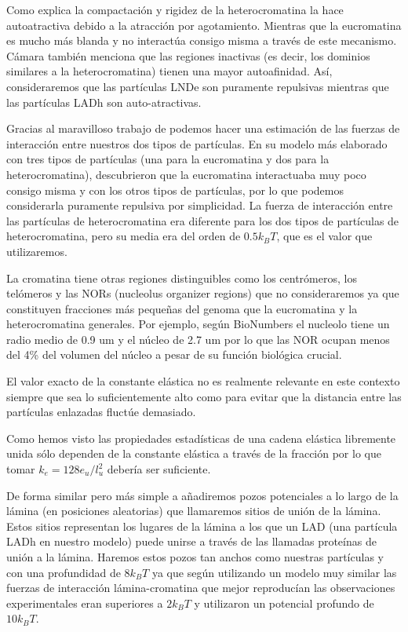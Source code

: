 Como explica \cite{Camara2023} la compactación y rigidez de la heterocromatina la hace autoatractiva debido a la atracción por agotamiento. Mientras que la eucromatina es mucho más blanda y no interactúa consigo misma a través de este mecanismo. Cámara también menciona que las regiones inactivas (es decir, los dominios similares a la heterocromatina) tienen una mayor autoafinidad. Así, consideraremos que las partículas LNDe son puramente repulsivas mientras que las partículas LADh son auto-atractivas.

Gracias al maravilloso trabajo de \cite{Falk2019} podemos hacer una estimación de las fuerzas de interacción entre nuestros dos tipos de partículas. En su modelo más elaborado con tres tipos de partículas (una para la eucromatina y dos para la heterocromatina), descubrieron que la eucromatina interactuaba muy poco consigo misma y con los otros tipos de partículas, por lo que podemos considerarla puramente repulsiva por simplicidad. La fuerza de interacción entre las partículas de heterocromatina era diferente para los dos tipos de partículas de heterocromatina, pero su media era del orden de $0.5k_BT$, que es el valor que utilizaremos.

La cromatina tiene otras regiones distinguibles como los centrómeros, los telómeros y las NORs (nucleolus organizer regions) que no consideraremos ya que constituyen fracciones más pequeñas del genoma que la eucromatina y la heterocromatina generales. Por ejemplo, según BioNumbers el nucleolo tiene un radio medio de 0.9 $\text{um}$ y el núcleo de 2.7 $\text{um}$ por lo que las NOR ocupan menos del 4\% del volumen del núcleo a pesar de su función biológica crucial.

El valor exacto de la constante elástica no es realmente relevante en este contexto siempre que sea lo suficientemente alto como para evitar que la distancia entre las partículas enlazadas fluctúe demasiado.

Como hemos visto las propiedades estadísticas de una cadena elástica libremente unida sólo dependen de la constante elástica a través de la fracción por lo que tomar $k_e=128e_u/l_u^2$ debería ser suficiente.

De forma similar pero más simple a \cite{Bajpai2021} añadiremos pozos potenciales a lo largo de la lámina (en posiciones aleatorias) que llamaremos sitios de unión de la lámina. Estos sitios representan los lugares de la lámina a los que un LAD (una partícula LADh en nuestro modelo) puede unirse a través de las llamadas proteínas de unión a la lámina. Haremos estos pozos tan anchos como nuestras partículas y con una profundidad de $8k_BT$ ya que según \cite{Maji2020} utilizando un modelo muy similar las fuerzas de interacción lámina-cromatina que mejor reproducían las observaciones experimentales eran superiores a $2k_BT$ y \cite{Bajpai2021} utilizaron un potencial profundo de $10k_BT$.

